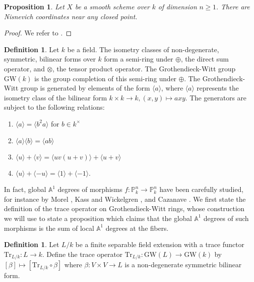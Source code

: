 \documentclass[12pt, reqno]{amsart}
\newtheorem{proposition}[theorem]{Proposition}
\theoremstyle{definition}
\newtheorem{definition}[theorem]{Definition}
\newcommand{\A}{\mathbb{A}} %
\newcommand{\Proj}{\mathbb{P}} %
\newcommand{\GW}{\mathrm{GW}} %
\newcommand{\Tr}{\mathrm{Tr}} %
\begin{document}
\begin{proposition}\label{curvenis}
Let $X$ be a smooth scheme over $k$ of dimension $n \geq 1$. There are Nisnevich coordinates near any closed point.
\end{proposition}
\begin{proof}
We refer to \cite[Proposition 20]{kwcubic}.
\end{proof}

\begin{definition}
Let $k$ be a field. The isometry classes of non-degenerate, symmetric, bilinear forms over $k$ form a semi-ring under $\oplus$, the direct sum operator, and $\otimes$, the tensor product operator. The Grothendieck-Witt group $\GW(k)$ is the group completion of this semi-ring under $\oplus$.
The Grothendieck-Witt group is generated by elements of the form $\langle a \rangle$, where $\langle a \rangle$ represents the isometry class of the bilinear form $k \times k \rightarrow k, (x,y) \mapsto axy$. The generators are subject to the following relations:
\begin{enumerate}
    \item $\langle a \rangle = \langle b^2 a \rangle$ for $b \in k^\times$
    \item $\langle a \rangle \langle b \rangle = \langle ab \rangle$
    \item $\langle u \rangle + \langle v \rangle = \langle uv(u+v) \rangle + \langle u+v \rangle$
    \item $\langle u \rangle + \langle -u \rangle = \langle 1 \rangle + \langle -1 \rangle$.
\end{enumerate}
\end{definition}

In fact, global $\A^1$ degrees of morphisms $f: \Proj^n_k \to \Proj^n_k$ have been carefully studied, for instance by Morel \cite{morel06}, Kass and Wickelgren \cite{kwEKL}, and Cazanave \cite{cazanave}. We first state the definition of the trace operator on Grothendieck-Witt rings, whose construction we will use to state a proposition which claims that the global $\A^1$ degrees of such morphisms is the sum of local $\A^1$ degrees at the fibers.

\begin{definition} \label{def:trace}
Let $L/k$ be a finite separable field extension with a trace functor $\Tr_{L/k}: L \rightarrow k$. Define the trace operator $\Tr_{L/k}: \GW(L) \rightarrow \GW(k)$ by $[\beta] \mapsto [\Tr_{L/k} \circ \beta]$ where $\beta: V \times V \rightarrow L$ is a non-degenerate symmetric bilinear form.
\end{definition}
\end{document}
